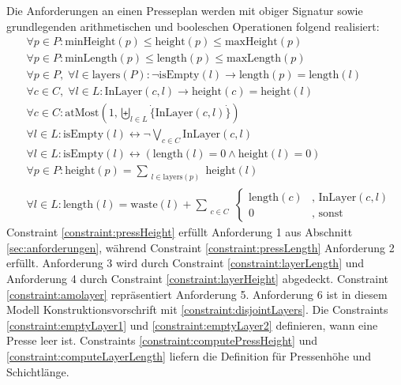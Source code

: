 Die Anforderungen an einen Presseplan werden mit obiger Signatur sowie grundlegenden arithmetischen und booleschen Operationen folgend realisiert:
\begin{align}
    & \forall p \in P: \text{minHeight}(p) \leq \text{height}(p) \leq \text{maxHeight}(p) \label{constraint:pressHeight} \\[10pt]
    & \forall p \in P: \text{minLength}(p) \leq \text{length}(p) \leq \text{maxLength}(p) \label{constraint:pressLength} \\[10pt]
    & \forall p \in P,\; \forall l \in \text{layers}(P): \neg \text{isEmpty}(l) \rightarrow \text{length}(p) = \text{length}(l) \label{constraint:layerLength} \\[10pt]
    & \forall c \in C,\; \forall l \in L: \text{InLayer}(c,l) \rightarrow \text{height}(c) = \text{height}(l) \label{constraint:layerHeight} \\[10pt]
    & \forall c \in C: \text{atMost}\left(1, \biguplus_{l \in L} \dot{\{} \text{InLayer}(c,l) \dot{\}}\right) \label{constraint:amolayer} \\[10pt]
    & \forall l \in L: \text{isEmpty}(l) \leftrightarrow \neg\bigvee_{c \in C} \text{InLayer}(c,l) \label{constraint:emptyLayer1} \\[10pt]
    & \forall l \in L: \text{isEmpty}(l) \leftrightarrow (\text{length}(l) = 0 \land \text{height}(l) = 0) \label{constraint:emptyLayer2} \\[10pt]
    & \forall p \in P: \text{height}(p) = \sum_{\substack{l \in \text{layers}(p)}} \text{height}(l) \label{constraint:computePressHeight} \\[10pt]
    & \forall l \in L: \text{length}(l) = \text{waste}(l) + \sum_{\substack{c \in C}}
    \begin{cases}
        \text{length}(c) & \text{, } \text{InLayer}(c,l) \\
        0 & \text{, sonst}
    \end{cases} \label{constraint:computeLayerLength}
\end{align}
Constraint \ref{constraint:pressHeight} erfüllt Anforderung 1 aus Abschnitt \ref{sec:anforderungen}, während Constraint \ref{constraint:pressLength} Anforderung 2 erfüllt.
Anforderung 3 wird durch Constraint \ref{constraint:layerLength} und Anforderung 4 durch Constraint \ref{constraint:layerHeight} abgedeckt.
Constraint \ref{constraint:amolayer} repräsentiert Anforderung 5.
Anforderung 6 ist in diesem Modell Konstruktionsvorschrift mit \ref{constraint:disjointLayers}.
Die Constraints \ref{constraint:emptyLayer1} und \ref{constraint:emptyLayer2} definieren, wann eine Presse leer ist.
Constraints \ref{constraint:computePressHeight} und \ref{constraint:computeLayerLength} liefern die Definition für Pressenhöhe und Schichtlänge.

